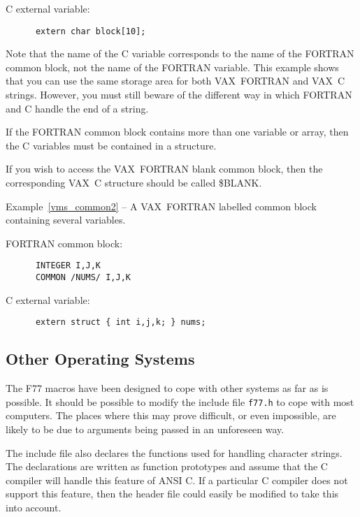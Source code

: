 \documentclass[twoside,11pt]{article}
\newcommand{\latex}[1]{#1}
\newcommand{\xlabel}[1]{}
\renewcommand{\_}{\texttt{\symbol{95}}}
\newcounter{examples}
\begin{document}
C external variable:
{\small \begin{verbatim}
      extern char block[10];
\end{verbatim} }

Note that the name of the C variable corresponds to the name of the FORTRAN
common block, not the name of the FORTRAN variable. This example shows that you
can use the same storage area for both VAX~FORTRAN and VAX~C strings. However, you must
still beware of the different way in which FORTRAN and C handle the end of
a string.

If the FORTRAN common block contains more than one variable or array, then the 
C variables must be contained in a structure.

If you wish to access the VAX~FORTRAN blank common block, then the
corresponding VAX~C structure should be called \$BLANK.

\label{vms_common2}
\begin{center}
Example\latex{~\ref{vms_common2}}
-- A VAX~FORTRAN labelled common block containing several variables.
\end{center}
\nopagebreak[4]
FORTRAN common block:
{\small \begin{verbatim}
      INTEGER I,J,K
      COMMON /NUMS/ I,J,K
\end{verbatim} }

C external variable:
{\small \begin{verbatim}
      extern struct { int i,j,k; } nums;
\end{verbatim} }

\subsection{\xlabel{other_operating_systems}Other Operating Systems}

The F77 macros have been designed to cope with other systems as far as is
possible. It should be possible to modify the include file \texttt{f77.h} to 
cope with most computers. 
The places where this may prove difficult, or even impossible,
are likely to be due to arguments being passed in an unforeseen way.

The include file also declares the functions used for handling character
strings. The declarations are written as function prototypes and assume that
the C compiler will handle this feature of ANSI C\@. If a particular C compiler
does not support this feature, then the header file could easily be modified to
take this into account.
\end{document}
